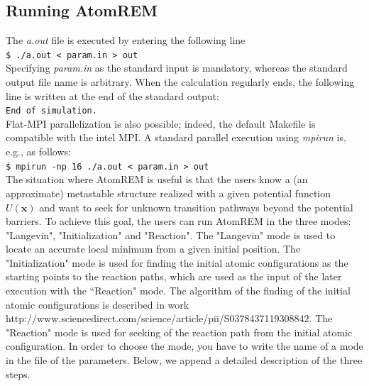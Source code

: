 \documentclass[preprint,12pt]{elsarticle}
\newcounter{bla}
\begin{document}


\subsection{Running AtomREM}
\label{sec:running}
The {\it a.out} file is executed by entering the following line\\
{\tt \$ ./a.out < param.in > out}\\
Specifying {\it param.in} as the standard input is mandatory, whereas the standard output file name is arbitrary. When the calculation regularly ends, the following line is written at the end of the standard output: \\
{\tt End of simulation.}\\
Flat-MPI parallelization is also possible; indeed, the default Makefile is compatible with the intel MPI. A standard parallel execution using {\it mpirun} is, e.g., as follows:\\
{\tt \$ mpirun -np 16 ./a.out < param.in > out}\\

The situation where AtomREM is useful is that the users know a (an approximate) metastable structure realized with a given potential function $U({\bm x})$ and want to seek for unknown transition pathways beyond the potential barriers. To achieve this goal, the users can run AtomREM in the three modes: "Langevin", "Initialization" and "Reaction". The "Langevin" mode is used to locate an accurate local minimum from a given initial position. The "Initialization" mode is used for finding the initial atomic configurations as the starting points to the reaction paths, which are used as the input of the later execution with the ``Reaction" mode. The algorithm of the finding of the initial atomic configurations is described in work http://www.sciencedirect.com/science/article/pii/S0378437119308842. The "Reaction" mode is used for seeking of the reaction path from the initial atomic configuration. In order to choose the mode, you have to write the name of a mode in the file of the parameters. Below, we append a detailed description of the three steps.
\end{document}
